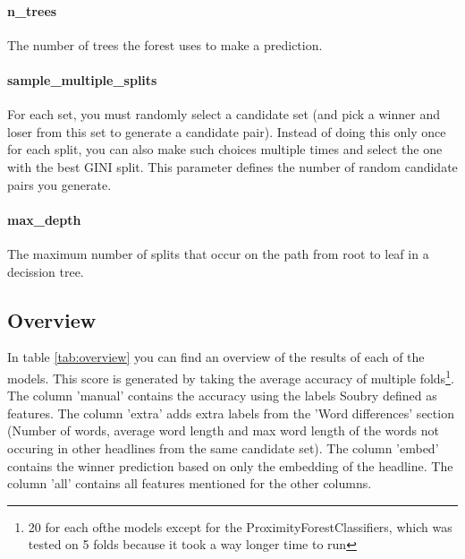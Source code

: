 \documentclass{article}
\begin{document}
 \paragraph{n\_trees} The number of trees the forest uses to make a prediction.

 \paragraph{sample\_multiple\_splits} For each set, you must randomly select a candidate set (and pick a winner and loser from this set to generate a candidate pair). Instead of doing this only once for each split, you can also make such choices multiple times and select the one with the best GINI split. This parameter defines the number of random candidate pairs you generate.

 \paragraph{max\_depth} The maximum number of splits that occur on the path from root to leaf in a decission tree.

\subsection{Overview}
In table \ref{tab:overview} you can find an overview of the results of each of the models. This score is generated by taking the average accuracy of multiple folds\footnote{20 for each ofthe models except for the ProximityForestClassifiers, which was tested on 5 folds because it took a way longer time to run}. The column 'manual' contains the accuracy using the labels Soubry defined as features. The column 'extra' adds extra labels from the 'Word differences' section (Number of words, average word length and max word length of the words not occuring in other headlines from the same candidate set). The column 'embed' contains the winner prediction based on only the embedding of the headline. The column 'all' contains all features mentioned for the other columns.
\end{document}
